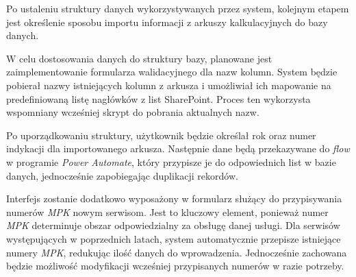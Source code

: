 Po ustaleniu struktury danych wykorzystywanych przez system, kolejnym etapem jest określenie sposobu importu informacji z arkuszy kalkulacyjnych do bazy danych.



W celu dostosowania danych do struktury bazy, planowane jest zaimplementowanie formularza walidacyjnego dla nazw kolumn. System będzie pobierał nazwy istniejących kolumn z arkusza i umożliwiał ich mapowanie na predefiniowaną listę nagłówków z list SharePoint. Proces ten wykorzysta wspomniany wcześniej skrypt do pobrania aktualnych nazw.

Po uporządkowaniu struktury, użytkownik będzie określał rok oraz numer indykacji dla importowanego arkusza. Następnie dane będą przekazywane do \emph{flow} w programie \emph{Power Automate}, który przypisze je do odpowiednich list w bazie danych, jednocześnie zapobiegając duplikacji rekordów.

Interfejs zostanie dodatkowo wyposażony w formularz służący do przypisywania numerów \emph{MPK} nowym serwisom. Jest to kluczowy element, ponieważ numer \emph{MPK} determinuje obszar odpowiedzialny za obsługę danej usługi. Dla serwisów występujących w poprzednich latach, system automatycznie przepisze istniejące numery \emph{MPK}, redukując ilość danych do wprowadzenia. Jednocześnie zachowana będzie możliwość modyfikacji wcześniej przypisanych numerów w razie potrzeby.

